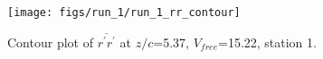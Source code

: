 \begin{figure}[H]
\centering
\texttt{[image: figs/run\_1/run\_1\_rr\_contour]}
\caption{Contour plot of $\overline{r^\prime r^\prime}$ at $z/c$=5.37, $V_{free}$=15.22, station 1.}
\label{fig:run_1_rr_contour}
\end{figure}


